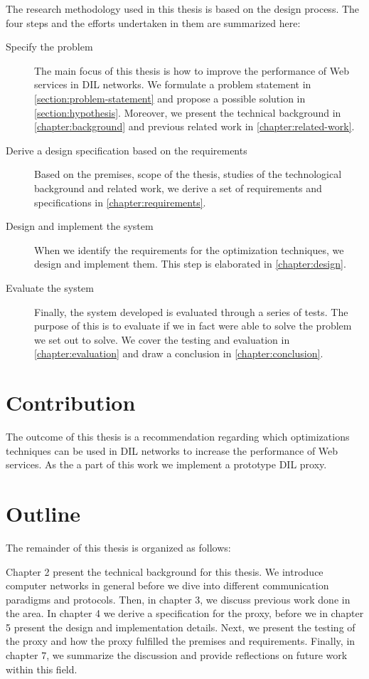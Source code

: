 The research methodology used in this thesis is based on the design process. The
four steps and the efforts undertaken in them are summarized here:

\begin{description}

    \item[Specify the problem] The main focus of this thesis is how to improve
    the performance of Web services in DIL networks. We formulate a problem
    statement in \cref{section:problem-statement} and propose a possible
    solution in \cref{section:hypothesis}. Moreover, we present the technical
    background in \cref{chapter:background} and previous related work in
    \cref{chapter:related-work}.

    \item[Derive a design specification based on the requirements] Based on the
    premises, scope of the thesis, studies of the technological background and
    related work, we derive a set of requirements and specifications in
    \cref{chapter:requirements}.

    \item[Design and implement the system] When we identify the requirements for
    the optimization techniques, we design and implement them. This step is
    elaborated in \cref{chapter:design}.

    \item[Evaluate the system] Finally, the system developed is evaluated through a
    series of tests. The purpose of this is to evaluate if we in fact were able
    to solve the problem we set out to solve. We cover the testing and
    evaluation in \cref{chapter:evaluation} and draw a conclusion in
    \cref{chapter:conclusion}.

\end{description}


\section{Contribution}

The outcome of this thesis is a recommendation regarding which optimizations
techniques can be used in DIL networks to increase the performance of Web
services. As the a part of this work we implement a prototype DIL proxy.

\section{Outline}

The remainder of this thesis is organized as follows:

Chapter 2 present the technical background for this thesis. We introduce
computer networks in general before we dive into different communication
paradigms and protocols. Then, in chapter 3, we discuss previous work done in
the area. In chapter 4 we derive a specification for the proxy, before we in
chapter 5 present the design and implementation details. Next, we present the
testing of the proxy and how the proxy fulfilled the premises and requirements.
Finally, in chapter 7, we summarize the discussion and provide reflections on
future work within this field.
